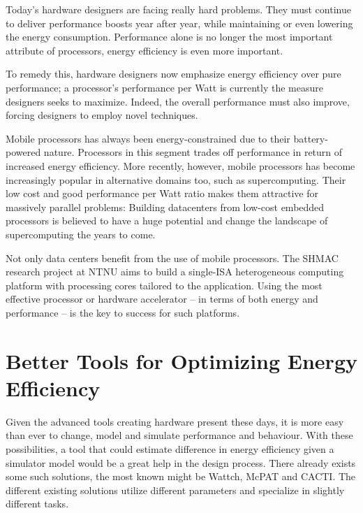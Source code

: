Today's hardware designers are facing really hard problems. They must
continue to deliver performance boosts year after year, while maintaining
or even lowering the energy consumption. Performance alone is no longer the most
important attribute of processors, energy efficiency is even more important.


To remedy this, hardware designers now emphasize energy efficiency over pure
performance; a processor's performance per Watt is currently the measure
designers seeks to maximize. Indeed, the overall performance must also improve,
forcing designers to employ novel techniques.


Mobile processors has always been energy-constrained due to their
battery-powered nature. Processors in this segment trades off performance in
return of increased energy efficiency. More recently, however, mobile processors
has become increasingly popular in alternative domains too, such as
supercomputing. Their low cost and good performance per Watt ratio makes them
attractive for massively parallel problems: Building datacenters from low-cost
embedded processors is believed to have a huge potential and change the
landscape of supercomputing the years to come.


Not only data centers benefit from the use of mobile processors. The SHMAC
research project at NTNU aims to build a single-ISA heterogeneous computing
platform with processing cores tailored to the application. Using the most
effective processor or hardware accelerator -- in terms of both energy
and performance -- is the key to success for such platforms.



\section{Better Tools for Optimizing Energy Efficiency}

Given the advanced tools creating hardware present these days, it is more easy
than ever to change, model and simulate performance and behaviour. With these
possibilities, a tool that could estimate difference in energy efficiency given
a simulator model would be a great help in the design process. There already
exists some such solutions, the most known might be
Wattch\cite{brooks2000wattch}, McPAT\cite{hpmcpat,li2013mcpat} and
CACTI\cite{hpcacti}. The different existing solutions utilize different
parameters and specialize in slightly different tasks.

